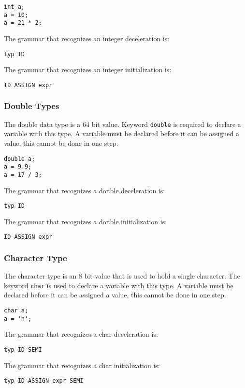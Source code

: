 \documentclass{article}
\begin{document}
\begin{lstlisting}
int a;
a = 10;
a = 21 * 2;
\end{lstlisting}

The grammar that recognizes an integer deceleration is: 
\begin{Verbatim}[frame=single]
typ ID
\end{Verbatim}

The grammar that recognizes an integer initialization is: 
\begin{Verbatim}[frame=single]
ID ASSIGN expr
\end{Verbatim}

\subsubsection{Double Types}
The double data type is a 64 bit value.  Keyword \texttt{double} is required to declare a variable with this type.  A variable must be declared before it can be assigned a value, this cannot be done in one step.

\begin{lstlisting}
double a;
a = 9.9;
a = 17 / 3;
\end{lstlisting}

The grammar that recognizes a double deceleration is: 
\begin{Verbatim}[frame=single]
typ ID
\end{Verbatim}

The grammar that recognizes a double initialization is: 
\begin{Verbatim}[frame=single]
ID ASSIGN expr
\end{Verbatim}

\subsubsection{Character Type}
The character type is an 8 bit value that is used to hold a single character. The keyword \texttt{char} is used to declare a variable with this type.  A variable must be declared before it can be assigned a value, this cannot be done in one step.
\begin{lstlisting}
char a;
a = 'h';
\end{lstlisting}

The grammar that recognizes a char deceleration is: 
\begin{Verbatim}[frame=single]
typ ID SEMI
\end{Verbatim}

The grammar that recognizes a char initialization is: 
\begin{Verbatim}[frame=single]
typ ID ASSIGN expr SEMI
\end{Verbatim}
\end{document}
